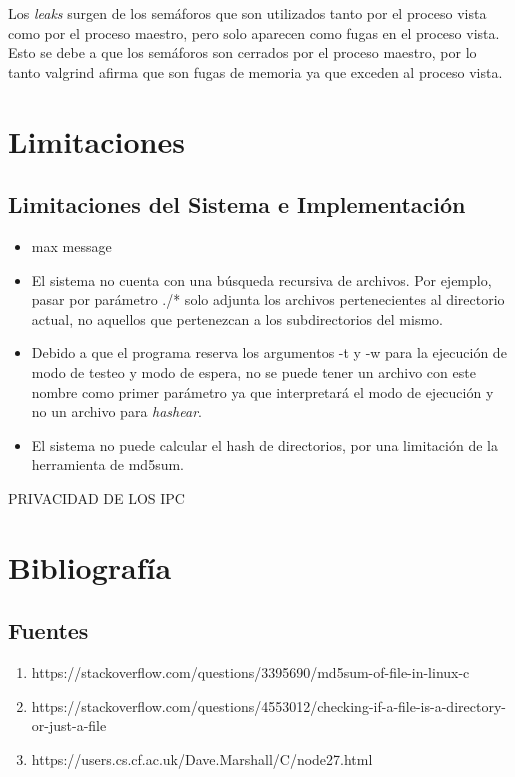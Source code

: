 \documentclass[10pt,a4paper]{report}
\begin{document}
Los \textit{leaks} surgen de los semáforos que son utilizados tanto por el proceso vista como por el proceso maestro, pero solo aparecen como fugas en el proceso vista. Esto se debe a que los semáforos son cerrados por el proceso maestro, por lo tanto valgrind afirma que son fugas de memoria ya que exceden al proceso vista. 


\chapter{Limitaciones}
\section{Limitaciones del Sistema e Implementación}

\begin{itemize}
\item max message

\item  El sistema no cuenta con una búsqueda recursiva de archivos. Por ejemplo, pasar por parámetro ./* solo adjunta los archivos
  pertenecientes al directorio actual, no aquellos que pertenezcan a los subdirectorios del mismo.

\item Debido a que el programa reserva los argumentos -t y -w para la ejecución de modo de testeo y modo de espera, no se puede tener un archivo con este nombre como primer parámetro ya que interpretará el modo de ejecución y no un archivo para \textit{hashear}.

\item   El sistema no puede calcular el hash de directorios, por una limitación de la herramienta de md5sum.
\end{itemize}

PRIVACIDAD DE LOS IPC


\chapter{Bibliografía}
\section{Fuentes}
\begin{enumerate}
\item https://stackoverflow.com/questions/3395690/md5sum-of-file-in-linux-c
\item https://stackoverflow.com/questions/4553012/checking-if-a-file-is-a-directory-or-just-a-file
\item https://users.cs.cf.ac.uk/Dave.Marshall/C/node27.html
\end{enumerate}
\end{document}
